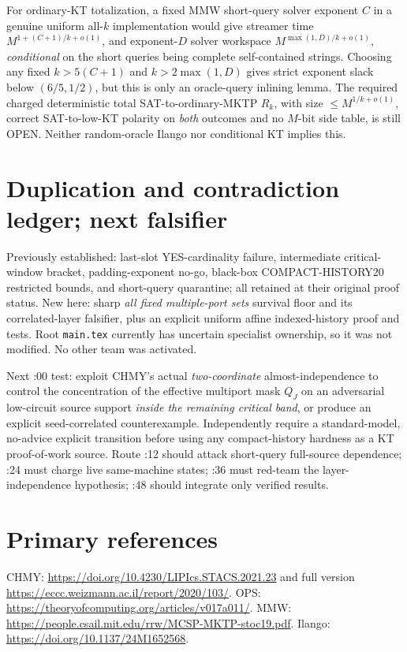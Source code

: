 \documentclass[11pt]{article}
\begin{document}
For ordinary-KT totalization, a fixed MMW short-query solver exponent $C$ in a genuine uniform all-$k$ implementation would give streamer time $M^{1+(C+1)/k+o(1)}$, and exponent-$D$ solver workspace $M^{\max(1,D)/k+o(1)}$, \emph{conditional} on the short queries being complete self-contained strings. Choosing any fixed $k>5(C+1)$ and $k>2\max(1,D)$ gives strict exponent slack below $(6/5,1/2)$, but this is only an oracle-query inlining lemma. The required charged deterministic total SAT-to-ordinary-MKTP $R_k$, with size $\le M^{1/k+o(1)}$, correct SAT-to-low-KT polarity on \emph{both} outcomes and no $M$-bit side table, is still OPEN. Neither random-oracle Ilango nor conditional KT implies this.

\section*{Duplication and contradiction ledger; next falsifier}
Previously established: last-slot YES-cardinality failure, intermediate critical-window bracket, padding-exponent no-go, black-box COMPACT-HISTORY20 restricted bounds, and short-query quarantine; all retained at their original proof status. New here: sharp \emph{all fixed multiple-port sets} survival floor and its correlated-layer falsifier, plus an explicit uniform affine indexed-history proof and tests. Root \texttt{main.tex} currently has uncertain specialist ownership, so it was not modified. No other team was activated.

Next :00 test: exploit CHMY's actual \emph{two-coordinate} almost-independence to control the concentration of the effective multiport mask $Q_J$ on an adversarial low-circuit source support \emph{inside the remaining critical band}, or produce an explicit seed-correlated counterexample. Independently require a standard-model, no-advice explicit transition before using any compact-history hardness as a KT proof-of-work source. Route :12 should attack short-query full-source dependence; :24 must charge live same-machine states; :36 must red-team the layer-independence hypothesis; :48 should integrate only verified results.

\section*{Primary references}
CHMY: \url{https://doi.org/10.4230/LIPIcs.STACS.2021.23} and full version \url{https://eccc.weizmann.ac.il/report/2020/103/}.
OPS: \url{https://theoryofcomputing.org/articles/v017a011/}.
MMW: \url{https://people.csail.mit.edu/rrw/MCSP-MKTP-stoc19.pdf}.
Ilango: \url{https://doi.org/10.1137/24M1652568}.
\end{document}
